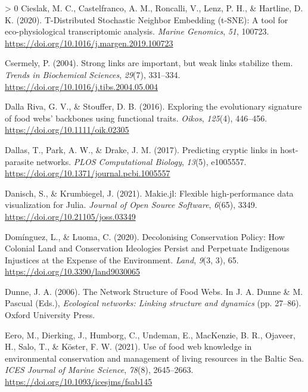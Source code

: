 \documentclass[10pt,oneside]{article}
\newlength{\cslhangindent}
\newenvironment{CSLReferences}[3] %
 {%
  \setlength{\parindent}{0pt}
  \ifodd #1 \everypar{\setlength{\hangindent}{\cslhangindent}}\ignorespaces\fi
  \ifnum #2 > 0
  \setlength{\parskip}{#2\baselineskip}
  \fi
 }%
 {}
\begin{document}
\begin{CSLReferences}{1}{0}
\leavevmode\hypertarget{ref-Cieslak2020TdiSto}{}%
Cieslak, M. C., Castelfranco, A. M., Roncalli, V., Lenz, P. H., \&
Hartline, D. K. (2020). T-Distributed Stochastic Neighbor Embedding
(t-SNE): A tool for eco-physiological transcriptomic analysis.
\emph{Marine Genomics}, \emph{51}, 100723.
\url{https://doi.org/10.1016/j.margen.2019.100723}

\leavevmode\hypertarget{ref-Csermely2004StrLin}{}%
Csermely, P. (2004). Strong links are important, but weak links
stabilize them. \emph{Trends in Biochemical Sciences}, \emph{29}(7),
331--334. \url{https://doi.org/10.1016/j.tibs.2004.05.004}

\leavevmode\hypertarget{ref-DallaRiva2016ExpEvo}{}%
Dalla Riva, G. V., \& Stouffer, D. B. (2016). Exploring the evolutionary
signature of food webs' backbones using functional traits. \emph{Oikos},
\emph{125}(4), 446--456. \url{https://doi.org/10.1111/oik.02305}

\leavevmode\hypertarget{ref-Dallas2017PreCry}{}%
Dallas, T., Park, A. W., \& Drake, J. M. (2017). Predicting cryptic
links in host-parasite networks. \emph{PLOS Computational Biology},
\emph{13}(5), e1005557.
\url{https://doi.org/10.1371/journal.pcbi.1005557}

\leavevmode\hypertarget{ref-Danisch2021MakJl}{}%
Danisch, S., \& Krumbiegel, J. (2021). Makie.jl: Flexible
high-performance data visualization for Julia. \emph{Journal of Open
Source Software}, \emph{6}(65), 3349.
\url{https://doi.org/10.21105/joss.03349}

\leavevmode\hypertarget{ref-Dominguez2020DecCon}{}%
Domínguez, L., \& Luoma, C. (2020). Decolonising Conservation Policy:
How Colonial Land and Conservation Ideologies Persist and Perpetuate
Indigenous Injustices at the Expense of the Environment. \emph{Land},
\emph{9}(3, 3), 65. \url{https://doi.org/10.3390/land9030065}

\leavevmode\hypertarget{ref-Dunne2006NetStr}{}%
Dunne, J. A. (2006). The Network Structure of Food Webs. In J. A. Dunne
\& M. Pascual (Eds.), \emph{Ecological networks: Linking structure and
dynamics} (pp. 27--86). Oxford University Press.

\leavevmode\hypertarget{ref-Eero2021UseFoo}{}%
Eero, M., Dierking, J., Humborg, C., Undeman, E., MacKenzie, B. R.,
Ojaveer, H., Salo, T., \& Köster, F. W. (2021). Use of food web
knowledge in environmental conservation and management of living
resources in the Baltic Sea. \emph{ICES Journal of Marine Science},
\emph{78}(8), 2645--2663. \url{https://doi.org/10.1093/icesjms/fsab145}


\end{CSLReferences}
\end{document}
